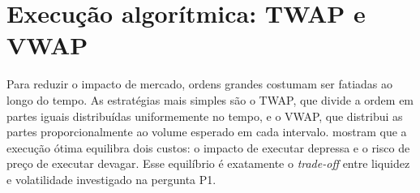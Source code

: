 \section{Execução algorítmica: TWAP e VWAP}\label{sec:twap}

Para reduzir o impacto de mercado, ordens grandes costumam ser fatiadas ao
longo do tempo. As estratégias mais simples são o TWAP, que divide a ordem em
partes iguais distribuídas uniformemente no tempo, e o VWAP, que distribui as
partes proporcionalmente ao volume esperado em cada intervalo.
 mostram que a execução ótima equilibra dois custos: o
impacto de executar depressa e o risco de preço de executar devagar. Esse
equilíbrio é exatamente o \textit{trade-off} entre liquidez e volatilidade
investigado na pergunta P1.
